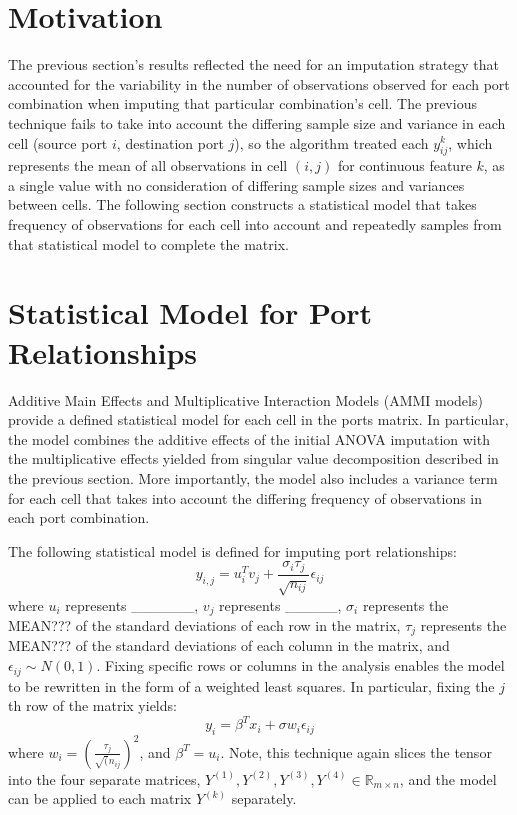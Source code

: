 \documentclass[12pt,twoside]{dukestatscithesis}
\theoremstyle{definition}
\theoremstyle{definition}
\theoremstyle{definition}
\theoremstyle{remark}
\begin{document}
\section{Motivation}\label{motivation-2}

The previous section's results reflected the need for an imputation
strategy that accounted for the variability in the number of
observations observed for each port combination when imputing that
particular combination's cell. The previous technique fails to take into
account the differing sample size and variance in each cell (source port
\(i\), destination port \(j\)), so the algorithm treated each
\(y_{ij}^{k}\), which represents the mean of all observations in cell
\((i,j)\) for continuous feature \(k\), as a single value with no
consideration of differing sample sizes and variances between cells. The
following section constructs a statistical model that takes frequency of
observations for each cell into account and repeatedly samples from that
statistical model to complete the matrix.

\section{Statistical Model for Port
Relationships}\label{statistical-model-for-port-relationships}

Additive Main Effects and Multiplicative Interaction Models (AMMI
models) provide a defined statistical model for each cell in the ports
matrix. In particular, the model combines the additive effects of the
initial ANOVA imputation with the multiplicative effects yielded from
singular value decomposition described in the previous section. More
importantly, the model also includes a variance term for each cell that
takes into account the differing frequency of observations in each port
combination.

The following statistical model is defined for imputing port
relationships:
\[y_{i,j} = u_i^Tv_j + \frac{\sigma_i \tau_j}{\sqrt{n_{ij}}}\epsilon_{ij}\]
where \(u_i\) represents \_\_\_\_\_\_, \(v_j\) represents \_\_\_\_\_,
\(\sigma_i\) represents the MEAN??? of the standard deviations of each
row in the matrix, \(\tau_j\) represents the MEAN??? of the standard
deviations of each column in the matrix, and
\(\epsilon_{ij} \sim N(0,1)\). Fixing specific rows or columns in the
analysis enables the model to be rewritten in the form of a weighted
least squares. In particular, fixing the \(j\)th row of the matrix
yields: \[y_i = \beta^Tx_i + \sigma w_i\epsilon_{ij}\] where
\(w_i = (\frac{\tau_j}{\sqrt(n_{ij}})^2\), and \(\beta^T = u_i\). Note,
this technique again slices the tensor into the four separate matrices,
\(Y^{(1)}, Y^{(2)}, Y^{(3)}, Y^{(4)} \in \mathbb{R}_{m \times n}\), and
the model can be applied to each matrix \(Y^{(k)}\) separately.
\end{document}
